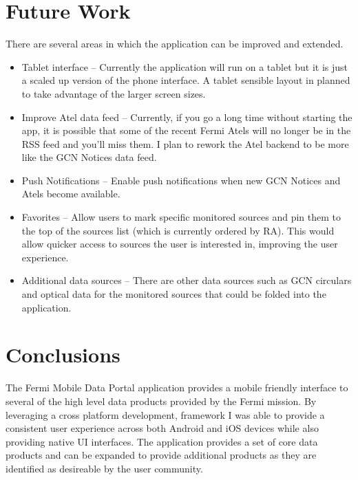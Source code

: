 \documentclass[11pt,twoside]{article}
\begin{document}
\section{Future Work}
There are several areas in which the application can be improved and extended. 
\begin{itemize}
\item{Tablet interface -- Currently the application will run on a tablet but it is just a scaled up version of the phone interface.  A tablet sensible layout in planned to take advantage of the larger screen sizes.}
\item{Improve Atel data feed -- Currently, if you go a long time without starting the app, it is possible that some of the recent Fermi Atels will no longer be in the RSS feed and you'll miss them.  I plan to rework the Atel backend to be more like the GCN Notices data feed.}
\item{Push Notifications -- Enable push notifications when new GCN Notices and Atels become available.}
\item{Favorites -- Allow users to mark specific monitored sources and pin them to the top of the sources list (which is currently ordered by RA). This would allow quicker access to sources the user is interested in, improving the user experience.}
\item{Additional data sources -- There are other data sources such as GCN circulars and optical data for the monitored sources that could be folded into the application.}
\end{itemize}

\section{Conclusions}
The Fermi Mobile Data Portal application provides a mobile friendly interface to several of the high level data products provided by the Fermi mission.  By leveraging a cross platform development, framework I was able to provide a consistent user experience across both Android and iOS devices while also providing native UI interfaces.  The application provides a set of core data products and can be expanded to provide additional products as they are identified as desireable by the user community.
\end{document}
